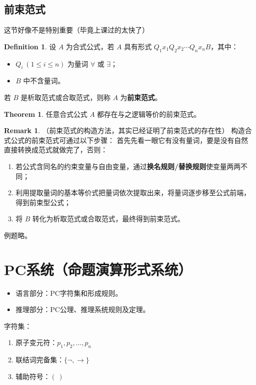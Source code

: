 \documentclass[oneside]{book}
\theoremstyle{definition}
\newtheorem{definition}{Definition}[section]
\newtheorem{theorem}{Theorem}[section]
\newtheorem{remark}{Remark}[section]
\begin{document}
\subsection{前束范式}
这节好像不是特别重要（毕竟上课过的太快了）
\begin{definition}
	设 \( A \) 为合式公式，若 \( A \) 具有形式 \( Q_1x_1Q_2x_2\cdots Q_nx_nB \)，其中：
	\begin{itemize}
		\item \( Q_i \ (1 \leq i \leq n) \) 为量词 \( \forall \) 或 \( \exists \)；
		\item \( B \) 中不含量词。
	\end{itemize}
	若 \( B \) 是析取范式或合取范式，则称 \( A \) 为\textbf{前束范式}。
\end{definition}

\begin{theorem}
	任意合式公式 \( A \) 都存在与之逻辑等价的前束范式。
\end{theorem}
\begin{remark}
	（前束范式的构造方法，其实已经证明了前束范式的存在性）
	构造合式公式的前束范式可通过以下步骤：
	首先先看一眼它有没有量词，要是没有自然直接转换成范式就做完了，否则：
	\begin{enumerate}
		\item 若公式含同名的约束变量与自由变量，通过\textbf{换名规则/替换规则}使变量两两不同；
		\item 利用提取量词的基本等价式把量词依次提取出来，将量词逐步移至公式前端，得到前束型公式；
		\item 将 \( B \) 转化为析取范式或合取范式，最终得到前束范式。
	\end{enumerate}
\end{remark}
例题略。
\section{PC系统（命题演算形式系统）}
\begin{itemize}
	\item 语言部分：PC字符集和形成规则。
	\item 推理部分：PC公理、推理系统规则及定理。
\end{itemize}
字符集：
\begin{enumerate}
	\item 原子变元符：\( p_1, p_2, \dots, p_n \)
	\item 联结词完备集：\( \{ \neg, \to \} \)
	\item 辅助符号：\( (  \ ) \)
\end{enumerate}
\end{document}
